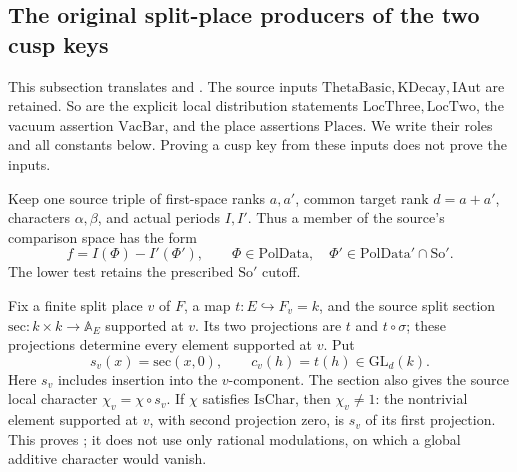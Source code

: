 \subsection{The original split-place producers of the two cusp keys}
\label{subsec:sr-source-acts-of-reads}

This subsection translates
 and
.
The source inputs \(\mathrm{ThetaBasic},\mathrm{KDecay},\mathrm{IAut}\)
are retained. So are the explicit local distribution statements
\(\mathrm{LocThree},\mathrm{LocTwo}\), the vacuum assertion
\(\mathrm{VacBar}\), and the place assertions \(\mathrm{Places}\).
We write their roles and all constants below.
Proving a cusp key from these inputs does not prove the inputs.

Keep one source triple of first-space ranks \(a,a'\), common target
rank \(d=a+a'\), characters \(\alpha,\beta\), and actual periods
\(I,I'\). Thus a member of the source's comparison space has the
form
\[
 f=I(\Phi)-I'(\Phi'),\qquad
 \Phi\in\mathrm{PolData},\quad
 \Phi'\in\mathrm{PolData}'\cap\mathrm{So}'.
 \tag{AK1}\label{eq:sr-source-key-comparison}
\]
The lower test retains the prescribed \(\mathrm{So}'\) cutoff.

Fix a finite split place \(v\) of \(F\), a map
\(t:E\hookrightarrow F_v=k\), and the source split section
\(\mathrm{sec}:k\times k\to\mathbb A_E\) supported at \(v\).
Its two projections are \(t\) and \(t\circ\sigma\);
these projections determine every element supported at \(v\).
Put
\[
 s_v(x)=\mathrm{sec}(x,0),\qquad
 c_v(h)=t(h)\in\mathrm{GL}_d(k).
\]
Here \(s_v\) includes insertion into the \(v\)-component.
The section also gives the source local character
\(\chi_v=\chi\circ s_v\).
If \(\chi\) satisfies \(\mathrm{IsChar}\), then
\(\chi_v\ne1\): the nontrivial element supported at \(v\),
with second projection zero, is \(s_v\) of its first projection.
This proves ; it does not use only rational
modulations, on which a global additive character would vanish.

